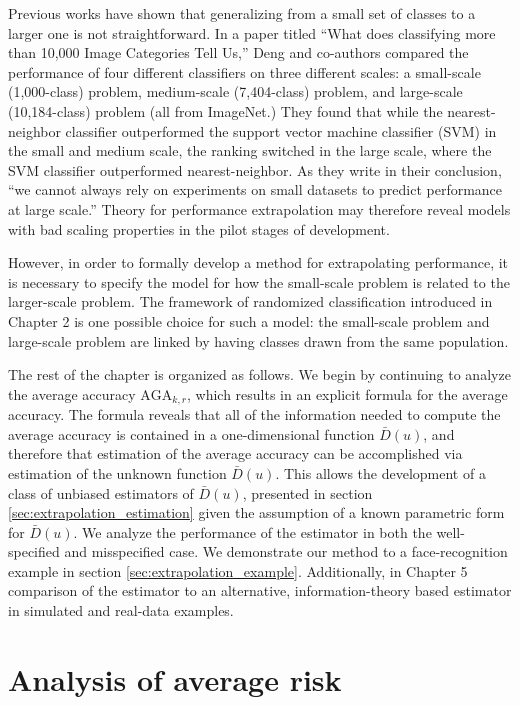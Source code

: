 Previous works have shown that generalizing from a small set of
classes to a larger one is not straightforward. In a paper titled
``What does classifying more than 10,000 Image Categories Tell Us,''
Deng and co-authors compared the performance of four different
classifiers on three different scales: a small-scale (1,000-class)
problem, medium-scale (7,404-class) problem, and large-scale
(10,184-class) problem (all from ImageNet.)  They found that while the
nearest-neighbor classifier outperformed the support vector machine
classifier (SVM) in the small and medium scale, the ranking switched
in the large scale, where the SVM classifier outperformed
nearest-neighbor.  As they write in their conclusion, ``we cannot
always rely on experiments on small datasets to predict performance at
large scale.'' Theory for performance extrapolation may therefore
reveal models with bad scaling properties in the pilot stages of
development.

However, in order to formally develop a method for extrapolating
performance, it is necessary to specify the model for how the
small-scale problem is related to the larger-scale problem.  The
framework of randomized classification introduced in Chapter 2 is one
possible choice for such a model: the small-scale problem and
large-scale problem are linked by having classes drawn from the same
population.

The rest of the chapter is organized as follows.  We begin by
continuing to analyze the average accuracy $\text{AGA}_{k, r}$, which
results in an explicit formula for the average accuracy.  The formula
reveals that all of the information needed to compute the average
accuracy is contained in a one-dimensional function $\bar{D}(u)$, and
therefore that estimation of the average accuracy can be accomplished
via estimation of the unknown function $\bar{D}(u)$.  This allows the
development of a class of unbiased estimators of $\bar{D}(u)$,
presented in section \ref{sec:extrapolation_estimation} given the
assumption of a known parametric form for $\bar{D}(u)$.  We analyze
the performance of the estimator in both the well-specified and
misspecified case.  We demonstrate our method to a face-recognition
example in section \ref{sec:extrapolation_example}.  Additionally, in
Chapter 5 %
comparison of the estimator to an alternative, information-theory
based estimator in simulated and real-data examples.

\section{Analysis of average risk}

